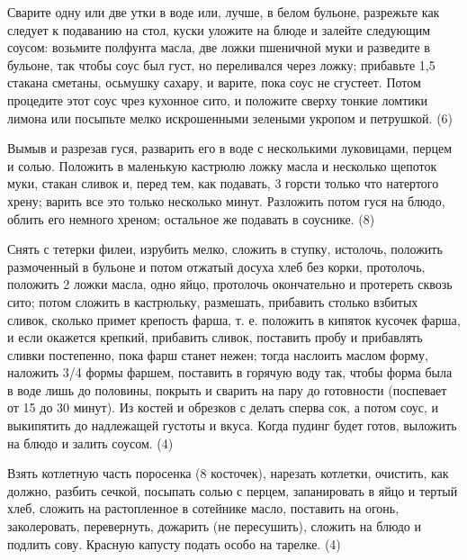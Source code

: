 
Сварите одну или две утки в воде или, лучше, в белом бульоне, разрежьте как следует к подаванию на стол, куски уложите на блюде и залейте следующим соусом: возьмите полфунта масла, две ложки пшеничной муки и разведите в бульоне, так чтобы соус был густ, но переливался через ложку; прибавьте 1,5 стакана сметаны, осьмушку сахару, и варите, пока соус не сгустеет. Потом процедите этот соус чрез кухонное сито, и положите сверху тонкие ломтики лимона или посыпьте мелко искрошенными зелеными укропом и петрушкой. (6) 


Вымыв и разрезав гуся, разварить его в воде с несколькими луковицами, перцем и солью. Положить в маленькую кастрюлю ложку масла и несколько щепоток муки, стакан сливок и, перед тем, как подавать, 3 горсти только что натертого хрену; варить все это только несколько минут. Разложить потом гуся на блюдо, облить его немного хреном; остальное же подавать в соуснике. (8) 


Снять с тетерки филеи, изрубить мелко, сложить в ступку, истолочь, положить размоченный в бульоне и потом отжатый досуха хлеб без корки, протолочь, положить 2 ложки масла, одно яйцо, протолочь окончательно и протереть сквозь сито; потом сложить в кастрюльку, размешать, прибавить столько взбитых сливок, сколько примет крепость фарша, т. е. положить в кипяток кусочек фарша, и если окажется крепкий, прибавить сливок, поставить пробу и прибавлять сливки постепенно, пока фарш станет нежен; тогда наслоить маслом форму, наложить 3/4 формы фаршем, поставить в горячую воду так, чтобы форма была в воде лишь до половины, покрыть и сварить на пару до готовности (поспевает от 15 до 30 минут). Из костей и обрезков с делать сперва сок, а потом соус, и выкипятить до надлежащей густоты и вкуса. Когда пудинг будет готов, выложить на блюдо и залить соусом. (4) 


Взять котлетную часть поросенка (8 косточек), нарезать котлетки, очистить, как должно, разбить сечкой, посыпать солью с перцем, запанировать в яйцо и тертый хлеб, сложить на растопленное в сотейнике масло, поставить на огонь, заколеровать, перевернуть, дожарить (не пересушить), сложить на блюдо и подлить сову. Красную капусту подать особо на тарелке. (4) 


